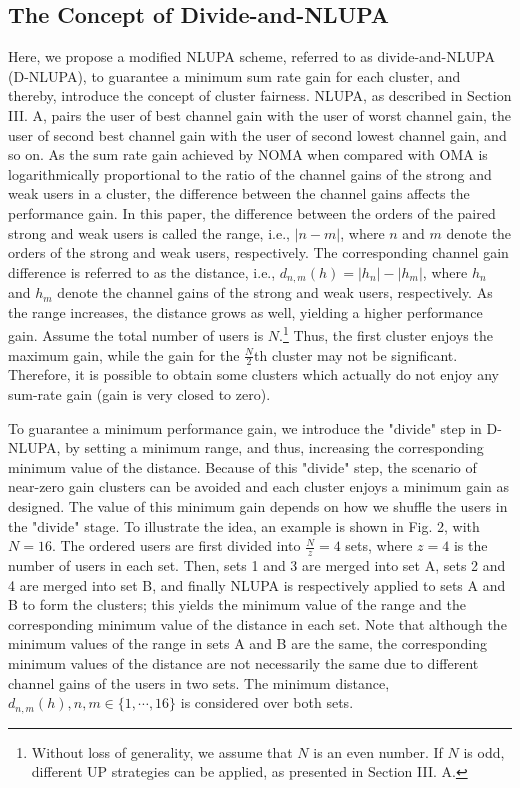 \documentclass[10pt,final,journal,a4paper,twoside,twocolumn,romanappendices]{IEEEtran}
\theoremstyle{myremark}
\theoremstyle{myremark}
\begin{document}
\vspace{-0.2cm}
\subsection{The Concept of Divide-and-NLUPA}
Here, we propose a modified NLUPA scheme, referred to as divide-and-NLUPA (D-NLUPA), to guarantee a minimum sum rate gain for each cluster, {\color{black}and thereby, introduce the concept of cluster fairness}. NLUPA, as described in Section III. A, pairs the user of best channel gain with the user of worst channel gain, the user of second best channel gain with the user of second lowest channel gain, and so on. As the sum rate gain achieved by NOMA when compared with OMA is logarithmically proportional to the ratio of the channel gains of the strong and weak users in a cluster, the difference between the channel gains  affects the performance gain. {\color{black}In this paper, the difference between the orders of the paired strong and weak users is called the range, i.e., $|n-m|$, where $n$ and $m$ denote the orders of the strong and weak users, respectively. The corresponding channel gain difference is referred to as the distance, i.e., $d_{n,m} (h)=|h_n |-|h_m |$, where $h_n$ and $h_m$ denote the channel gains of the strong and weak users, respectively. As the range increases, the distance grows as well, yielding a higher performance gain}. Assume the total number of users is $N$.\footnote[2]{Without loss of generality, we assume that $N$ is an even number. If $N$ is odd, different UP strategies can be applied, as presented in Section III. A.} Thus, the first cluster enjoys the maximum gain, while the gain for the $\frac{N}{2}$th cluster may not be significant. {\color{black}Therefore, it is possible to obtain some clusters which actually do not enjoy any sum-rate gain (gain is very closed to zero)}. 

{\color{black}To guarantee a minimum performance gain, we introduce the "divide" step in D-NLUPA, by setting a minimum range, and thus, increasing the corresponding minimum value of the distance}. Because of this "divide" step, the scenario of near-zero gain clusters can be avoided and each cluster enjoys a minimum gain as designed. The value of this {\color{black}minimum gain} depends on how we shuffle the users in the "divide" stage. To illustrate the idea, an example is shown in Fig. 2, with $N=16$. {\color{black}The ordered users are first divided into $\frac{N}{z}=4$ sets, where $z=4$ is the number of users in each set. Then, sets 1 and 3 are merged into set A, sets 2 and 4 are merged into set B}, and finally NLUPA is respectively applied to sets A and B to form the clusters; this yields {\color{black}the minimum value of the range} {\color{black}and the corresponding minimum value of the distance in each set. Note that although the minimum values of the range in sets A and B are the same, the corresponding minimum values of the distance are not necessarily the same due to different channel gains of the users in two sets. The minimum distance, $d_{n,m}(h), n,m \in \{1,\cdots,16\}$ is considered over both sets. }
\end{document}
